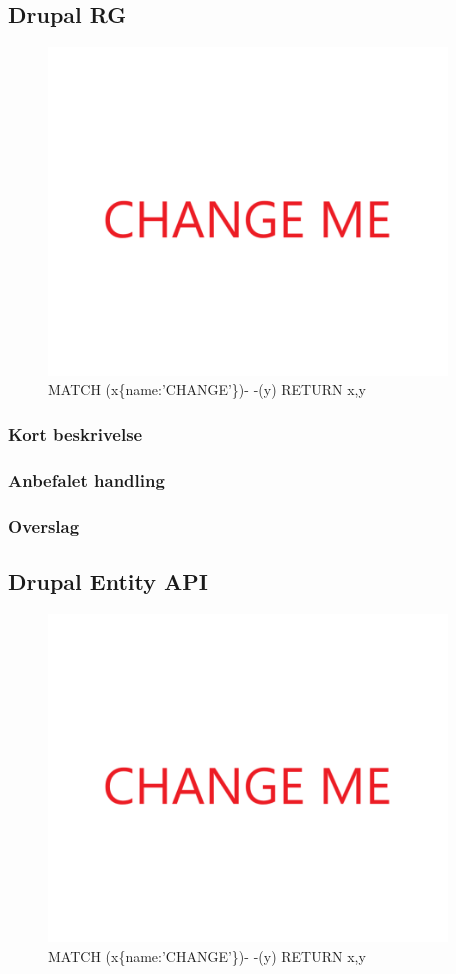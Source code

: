 \documentclass{article}
\begin{document}
\subsection{Drupal RG}
\begin{figure}[h]
\includegraphics[width=300pt]{CHANGE.PNG}
\caption{MATCH (x\{name:'CHANGE'\})- -(y) RETURN x,y}
\end{figure}
\subsubsection{Kort beskrivelse}
\subsubsection{Anbefalet handling}
\subsubsection{Overslag}
\subsection{Drupal Entity API}
\begin{figure}[h]
\includegraphics[width=300pt]{CHANGE.PNG}
\caption{MATCH (x\{name:'CHANGE'\})- -(y) RETURN x,y}
\end{figure}
\end{document}
